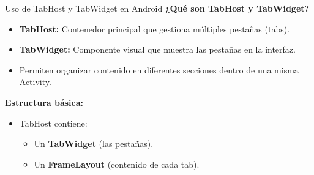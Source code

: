 \begin{frame}[fragile]{Uso de TabHost y TabWidget en Android}
\textbf{¿Qué son TabHost y TabWidget?}

\begin{itemize}
    \item \textbf{TabHost:} Contenedor principal que gestiona múltiples pestañas (tabs).
    \item \textbf{TabWidget:} Componente visual que muestra las pestañas en la interfaz.
    \item Permiten organizar contenido en diferentes secciones dentro de una misma Activity.
\end{itemize}

\vspace{0.3cm}

\textbf{Estructura básica:}
\begin{itemize}
    \item TabHost contiene:
    \begin{itemize}
        \item Un \textbf{TabWidget} (las pestañas).
        \item Un \textbf{FrameLayout} (contenido de cada tab).
    \end{itemize}
\end{itemize}

\end{frame}


